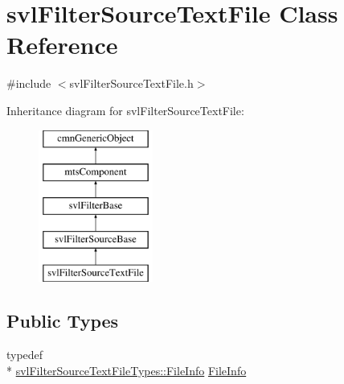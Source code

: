 \hypertarget{classsvl_filter_source_text_file}{\section{svl\-Filter\-Source\-Text\-File Class Reference}
\label{classsvl_filter_source_text_file}
}


{\ttfamily \#include $<$svl\-Filter\-Source\-Text\-File.\-h$>$}

Inheritance diagram for svl\-Filter\-Source\-Text\-File\-:\begin{figure}[H]
\begin{center}
\leavevmode
\includegraphics[height=5.000000cm]{de/d87/classsvl_filter_source_text_file}
\end{center}
\end{figure}
\subsection*{Public Types}
\begin{DoxyCompactItemize}
\item 
typedef \\*
\hyperlink{classsvl_filter_source_text_file_types_1_1_file_info}{svl\-Filter\-Source\-Text\-File\-Types\-::\-File\-Info} \hyperlink{classsvl_filter_source_text_file_a84944643e5cff813e434ffcdb29be62d}{File\-Info}
\end{DoxyCompactItemize}
